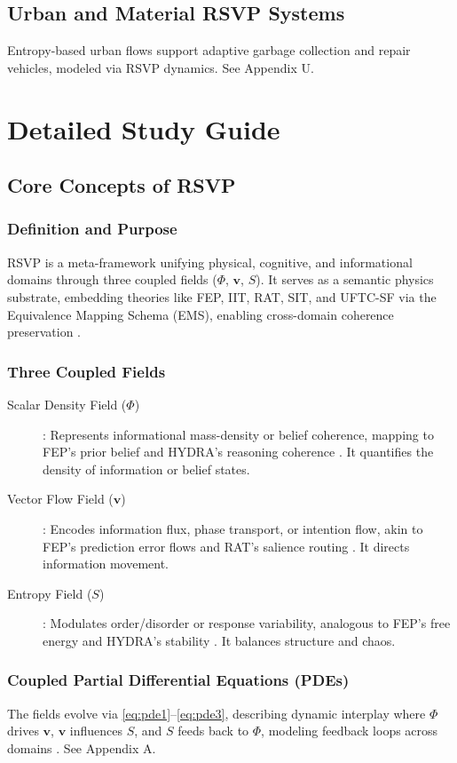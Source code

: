 \documentclass[12pt]{report}
\newcommand{\PhiRSVP}{\Phi}
\newcommand{\vRSVP}{\mathbf{v}}
\newcommand{\SRSVP}{S}
\begin{document}
{\chapter{Urban and Material RSVP Systems}
Entropy-based urban flows support adaptive garbage collection and repair vehicles, modeled via RSVP dynamics. See Appendix U.

\part{Detailed Study Guide}

\chapter{Core Concepts of RSVP}
\section{Definition and Purpose}
RSVP is a meta-framework unifying physical, cognitive, and informational domains through three coupled fields (\(\PhiRSVP\), \(\vRSVP\), \(\SRSVP\)). It serves as a semantic physics substrate, embedding theories like FEP, IIT, RAT, SIT, and UFTC-SF via the Equivalence Mapping Schema (EMS), enabling cross-domain coherence preservation \citep{RSVPMeta2025}.

\section{Three Coupled Fields}
\begin{description}
    \item[Scalar Density Field (\(\PhiRSVP\))]: Represents informational mass-density or belief coherence, mapping to FEP’s prior belief \citep{Friston2010} and HYDRA’s reasoning coherence \citep{HYDRA2025}. It quantifies the density of information or belief states.
    \item[Vector Flow Field (\(\vRSVP\))]: Encodes information flux, phase transport, or intention flow, akin to FEP’s prediction error flows and RAT’s salience routing \citep{RAT2025}. It directs information movement.
    \item[Entropy Field (\(\SRSVP\))]: Modulates order/disorder or response variability, analogous to FEP’s free energy and HYDRA’s stability \citep{Friston2010, HYDRA2025}. It balances structure and chaos.
\end{description}

\section{Coupled Partial Differential Equations (PDEs)}
The fields evolve via \eqref{eq:pde1}--\eqref{eq:pde3}, describing dynamic interplay where \(\PhiRSVP\) drives \(\vRSVP\), \(\vRSVP\) influences \(\SRSVP\), and \(\SRSVP\) feeds back to \(\PhiRSVP\), modeling feedback loops across domains \citep{RSVPMeta2025}. See Appendix A.

}
\end{document}
